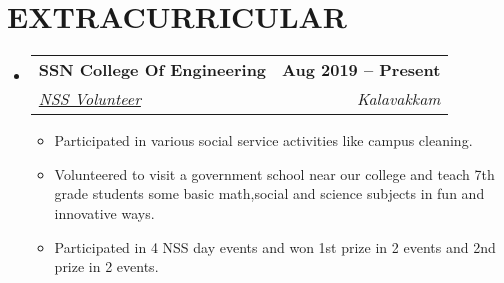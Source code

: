 \documentclass[letterpaper,11pt]{article}
\makeatletter
\newcommand{\resumeItem}[1]{
  \item\small{
    {#1 \vspace{-2pt}}
  }
}
\newcommand{\resumeSubheading}[4]{
  \vspace{-2pt}\item
    \begin{tabular*}{1.0\textwidth}[t]{l@{\extracolsep{\fill}}r}
      \textbf{\large#1} & \textbf{\small #2} \\
      \textit{\large#3} & \textit{\small #4} \\
      
    \end{tabular*}\vspace{-7pt}
}
\newcommand{\resumeSubHeadingListStart}{\begin{itemize}[leftmargin=0.0in, label={}]}
\newcommand{\resumeSubHeadingListEnd}{\end{itemize}}
\newcommand{\resumeItemListStart}{\begin{itemize}}
\newcommand{\resumeItemListEnd}{\end{itemize}\vspace{-5pt}}
\newcommand\sbullet[1][.5]{\mathbin{\vcenter{\hbox{\scalebox{#1}{$\bullet$}}}}}
\makeatother
\begin{document}
\section{EXTRACURRICULAR}
    \resumeSubHeadingListStart
        \resumeSubheading{SSN College Of Engineering}{Aug 2019 -- Present}{\underline{NSS Volunteer}}{Kalavakkam}
            \linebreak{}
            \resumeItemListStart
                \resumeItem{\normalsize{Participated in various social service activities like campus cleaning.}}
                \resumeItem{\normalsize{Volunteered to visit a government school near our college and teach 7th grade students some basic math,social and science subjects in fun and innovative ways.}}
                \resumeItem{\normalsize{Participated in 4 NSS day events and won 1st prize in 2 events and 2nd prize in 2 events.}}
            \resumeItemListEnd
    \resumeSubHeadingListEnd
 \vspace{-11pt}
 



\end{document}
